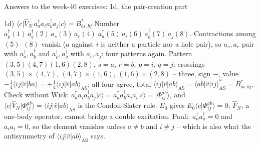 \documentclass[aspectratio=169,10pt]{beamer}
\newcommand{\ket}[1]{\vert #1\rangle}
\newcommand{\braket}[2]{\langle #1\vert #2\rangle}
\newcommand{\element}[3]{\langle #1\vert #2\vert #3\rangle}
\begin{document}
\begin{frame}{Answers to the week-40 exercises: 1d, the pair-creation part}
  \footnotesize
  \begin{block}{1d) $\element{c}{\hat V_N\,a_a^{\dagger}a_ia_b^{\dagger}a_j}{c}=B^{*}_{ai,bj}$}
    Number $a_p^{\dagger}(1)\,a_q^{\dagger}(2)\,a_s(3)\,a_r(4)\;a_a^{\dagger}(5)\,a_i(6)\,a_b^{\dagger}(7)\,a_j(8)$. Contractions among $(5)$--$(8)$ vanish ($a$ against $i$ is neither a particle nor a hole pair), so $a_s,a_r$ pair with $a_a^{\dagger},a_b^{\dagger}$ and $a_p^{\dagger},a_q^{\dagger}$ with $a_i,a_j$: four patterns again. Pattern $(3,5)(4,7)(1,6)(2,8)$, $s=a$, $r=b$, $p=i$, $q=j$: crossings $(3,5)\times(4,7)$, $(4,7)\times(1,6)$, $(1,6)\times(2,8)$ -- three, sign $-$, value $-\frac14\element{ij}{\hat v}{ba}=+\frac14\element{ij}{\hat v}{ab}_{\mathrm{AS}}$; all four agree, total $\element{ij}{\hat v}{ab}_{\mathrm{AS}}=\element{ab}{\hat v}{ij}^{*}_{\mathrm{AS}}=B^{*}_{ai,bj}$.
    Check without Wick: $a_a^{\dagger}a_ia_b^{\dagger}a_j\ket c=a_a^{\dagger}a_b^{\dagger}a_ja_i\ket c=\ket{\Phi_{ij}^{ab}}$, and $\element{c}{\hat V_N}{\Phi_{ij}^{ab}}=\element{ij}{\hat v}{ab}_{\mathrm{AS}}$ is the Condon-Slater rule. $E_0$ gives $E_0\braket{c}{\Phi_{ij}^{ab}}=0$; $\hat F_N$, a one-body operator, cannot bridge a double excitation. Pauli: $a_a^{\dagger}a_a^{\dagger}=0$ and $a_ia_i=0$, so the element vanishes unless $a\ne b$ and $i\ne j$ -- which is also what the antisymmetry of $\element{ij}{\hat v}{ab}_{\mathrm{AS}}$ says.
  \end{block}
\end{frame}
\end{document}
